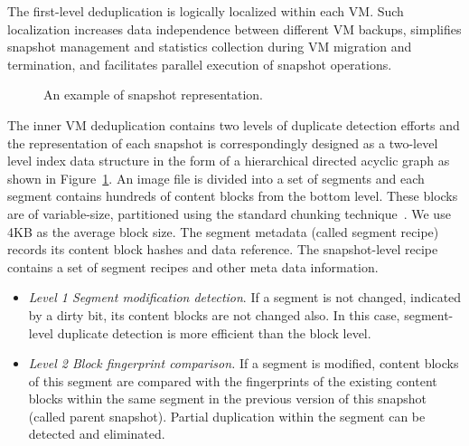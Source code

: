 The first-level deduplication is logically localized within each VM.
Such localization increases data independence between different  VM backups,
simplifies  snapshot  management and statistics collection during VM migration and termination,
and facilitates parallel execution of snapshot operations.

\begin{figure}[htbp]
  \centering
  \caption{An example  of snapshot representation.}
  \label{fig:snapshot}
\end{figure}

The inner VM deduplication contains two levels of duplicate detection efforts and the representation of
each snapshot is correspondingly designed as a two-level level index data structure in the form of a hierarchical
directed acyclic graph as shown in Figure~\ref{fig:snapshot}.
An image file is divided into a set of segments and each  segment contains hundreds of content blocks from the bottom level.
These blocks are of variable-size, partitioned using
the standard chunking technique~\cite{similar94}.  We use 4KB as the average block size. 
The segment metadata (called segment recipe) records its  content block hashes and  data reference. 
The snapshot-level recipe contains a set of  segment recipes and other meta data information.
\begin{itemize}
\item {\em Level 1 Segment modification  detection}.
If a segment is not changed, indicated by a dirty bit, its content blocks are not changed also. In this case,
 segment-level duplicate detection is more efficient than the block level. 

\item {\em Level 2  Block fingerprint comparison.}
If a segment is modified, content blocks of this segment are compared with 
the fingerprints of the existing content blocks within the same segment in
the previous version of this snapshot (called parent  snapshot). Partial duplication
within the segment can be detected and eliminated. 
\end{itemize}

